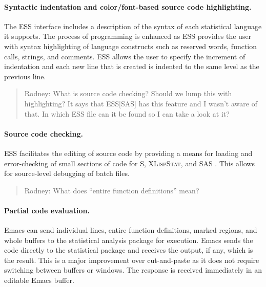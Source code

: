 \documentclass{article}
\newcommand*{\SAS}{\textsc{SAS}{\textregistered} }
\newcommand*{\XLispStat}{\textsc{XLispStat}}
\begin{document}
\paragraph{Syntactic indentation and color/font-based source code
  highlighting.}  The ESS interface includes a description of the
syntax of each statistical language it supports.
The process of programming is enhanced as ESS provides the user with
syntax highlighting of language constructs such as reserved words,
function calls, strings, and comments.  ESS allows the user to specify
the increment of indentation and each new line that is created is indented
to the same level as the previous line.

\begin{quote}
 Rodney:  What is source code checking?  Should we lump this with highlighting?
 It says that ESS[SAS] has this feature and I wasn't aware of that.  In
 which ESS file can it be found so I can take a look at it?
\end{quote}

\paragraph{Source code checking.}
ESS facilitates the editing of source code by providing a means for
loading and error-checking of small sections of code for S,
\XLispStat, and \SAS.  This allows for source-level debugging of batch
files.

\begin{quote}
 Rodney:  What does ``entire function definitions'' mean?
\end{quote}

\paragraph{Partial code evaluation.}
Emacs can send individual lines, entire function definitions, marked
regions, and whole buffers to the statistical analysis package for
execution.  Emacs sends the code directly to
the statistical package and receives the output, if any, which is
the result.  This is a major improvement over cut-and-paste as it does
not require switching between buffers or windows.  The response is received
immediately in an editable Emacs buffer.
\end{document}
